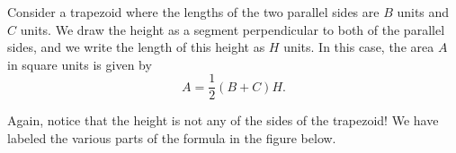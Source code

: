 \documentclass{ximera}
\begin{document}
\begin{theorem}
Consider a trapezoid where the lengths of the two parallel sides are $B$ units and $C$ units. We draw the height as a segment perpendicular to both of the parallel sides, and we write the length of this height as $H$ units. In this case, the area $A$ in square units is given by
\[
A = \frac12 (B+C)H.
\]
\end{theorem}
Again, notice that the height is not any of the sides of the trapezoid! We have labeled the various parts of the formula in the figure below.
\begin{image}
\end{image}
\end{document}
